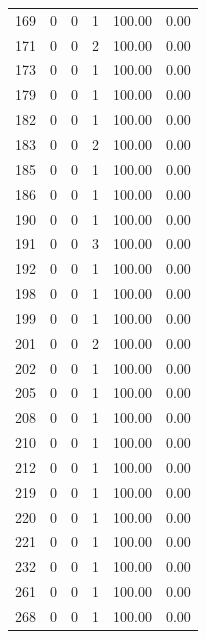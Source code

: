 \documentclass[11pt]{article}
\begin{document}
\begin{longtable}{r|r|r|r|r|r}
    169   & 0     & 0     & 1     & 100.00 & 0.00 \\
    171   & 0     & 0     & 2     & 100.00 & 0.00 \\
    173   & 0     & 0     & 1     & 100.00 & 0.00 \\
    179   & 0     & 0     & 1     & 100.00 & 0.00 \\
    182   & 0     & 0     & 1     & 100.00 & 0.00 \\
    183   & 0     & 0     & 2     & 100.00 & 0.00 \\
    185   & 0     & 0     & 1     & 100.00 & 0.00 \\
    186   & 0     & 0     & 1     & 100.00 & 0.00 \\
    190   & 0     & 0     & 1     & 100.00 & 0.00 \\
    191   & 0     & 0     & 3     & 100.00 & 0.00 \\
    192   & 0     & 0     & 1     & 100.00 & 0.00 \\
    198   & 0     & 0     & 1     & 100.00 & 0.00 \\
    199   & 0     & 0     & 1     & 100.00 & 0.00 \\
    201   & 0     & 0     & 2     & 100.00 & 0.00 \\
    202   & 0     & 0     & 1     & 100.00 & 0.00 \\
    205   & 0     & 0     & 1     & 100.00 & 0.00 \\
    208   & 0     & 0     & 1     & 100.00 & 0.00 \\
    210   & 0     & 0     & 1     & 100.00 & 0.00 \\
    212   & 0     & 0     & 1     & 100.00 & 0.00 \\
    219   & 0     & 0     & 1     & 100.00 & 0.00 \\
    220   & 0     & 0     & 1     & 100.00 & 0.00 \\
    221   & 0     & 0     & 1     & 100.00 & 0.00 \\
    232   & 0     & 0     & 1     & 100.00 & 0.00 \\
    261   & 0     & 0     & 1     & 100.00 & 0.00 \\
    268   & 0     & 0     & 1     & 100.00 & 0.00 \\
    \bottomrule
\end{longtable} 
\end{document}
